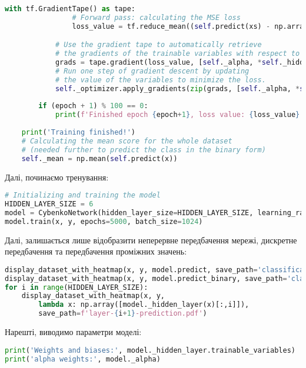 \begin{lstlisting}[language=Python]
            with tf.GradientTape() as tape:
                # Forward pass: calculating the MSE loss
                loss_value = tf.reduce_mean((self.predict(xs) - np.array([ys]))**2)

            # Use the gradient tape to automatically retrieve
            # the gradients of the trainable variables with respect to the loss.
            grads = tape.gradient(loss_value, [self._alpha, *self._hidden_layer.trainable_variables])
            # Run one step of gradient descent by updating
            # the value of the variables to minimize the loss.
            self._optimizer.apply_gradients(zip(grads, [self._alpha, *self._hidden_layer.trainable_variables]))
        
        if (epoch + 1) % 100 == 0:
            print(f'Finished epoch {epoch+1}, loss value: {loss_value}...')
    
    print('Training finished!')
    # Calculating the mean score for the whole dataset 
    # (needed further to predict the class in the binary form)
    self._mean = np.mean(self.predict(x))
\end{lstlisting}

Далі, починаємо тренування:
\begin{lstlisting}[language=Python]
# Initializing and training the model
HIDDEN_LAYER_SIZE = 6
model = CybenkoNetwork(hidden_layer_size=HIDDEN_LAYER_SIZE, learning_rate=0.05)
model.train(x, y, epochs=5000, batch_size=1024)
\end{lstlisting}

Далі, залишається лише відобразити неперервне передбачення мережі,
дискретне передбачення та передбачення проміжних значень:
\begin{lstlisting}[language=Python]
display_dataset_with_heatmap(x, y, model.predict, save_path='classification-cont-prediction.pdf')
display_dataset_with_heatmap(x, y, model.predict_binary, save_path='classification-discr-prediction.pdf')
for i in range(HIDDEN_LAYER_SIZE):
    display_dataset_with_heatmap(x, y, 
        lambda x: np.array([model._hidden_layer(x)[:,i]]), 
        save_path=f'layer-{i+1}-prediction.pdf')
\end{lstlisting}

Нарешті, виводимо параметри моделі:
\begin{lstlisting}[language=Python]
print('Weights and biases:', model._hidden_layer.trainable_variables)
print('alpha weights:', model._alpha)
\end{lstlisting}

